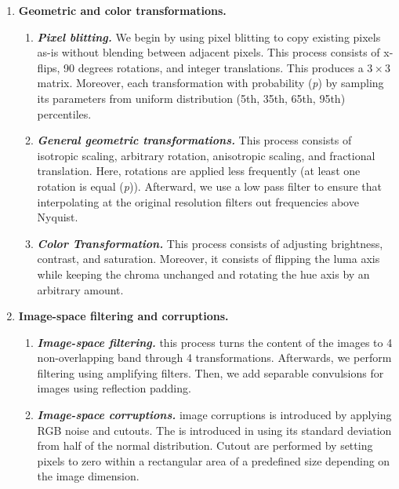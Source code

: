 \documentclass{report}
\begin{document}
\begin{itemize}
\begin{itemize}
 \begin{enumerate}
 \item \textbf{Geometric and color transformations.}\\ 
 \begin{enumerate}
 \item \textit{\textbf{Pixel blitting.}}
 We begin by using pixel blitting to copy existing pixels as-is without blending between adjacent pixels. This process consists of x-flips, 90 degrees rotations, and integer translations. This produces a $3\times3$ matrix. Moreover, each transformation with probability (\textit{p}) by sampling its parameters from uniform distribution (5th, 35th, 65th, 95th) percentiles.
  \item \textit{\textbf{General geometric transformations.}}
  This process consists of isotropic scaling, arbitrary rotation, anisotropic scaling, and fractional translation. Here, rotations are applied less frequently (at least one rotation is equal (\textit{p})). Afterward, we use a low pass filter to ensure that interpolating at the original resolution filters out frequencies above Nyquist. 
\item \textit{\textbf{Color Transformation.}}
This process consists of adjusting brightness, contrast, and saturation. Moreover, it consists of flipping the luma axis while keeping the chroma unchanged and rotating the hue axis by an arbitrary amount.\\
  \end{enumerate}
  
  \item \textbf{Image-space filtering and corruptions.} \\
  \begin{enumerate}
  \item \textbf{\textit{Image-space filtering.}}
  this process turns the content of the images to 4 non-overlapping band through 4 transformations.  Afterwards, we perform filtering using amplifying filters. Then, we add separable convulsions for images using reflection padding. 
  \item \textbf{\textit{Image-space corruptions.}}
  image corruptions is introduced by applying RGB noise and cutouts. The is introduced in using its standard deviation from half of the normal distribution. Cutout are performed by setting pixels to zero within a rectangular area of a predefined size depending on the image dimension.
  \end{enumerate}
   \end{enumerate}


\end{itemize}
\end{itemize}
\end{document}
